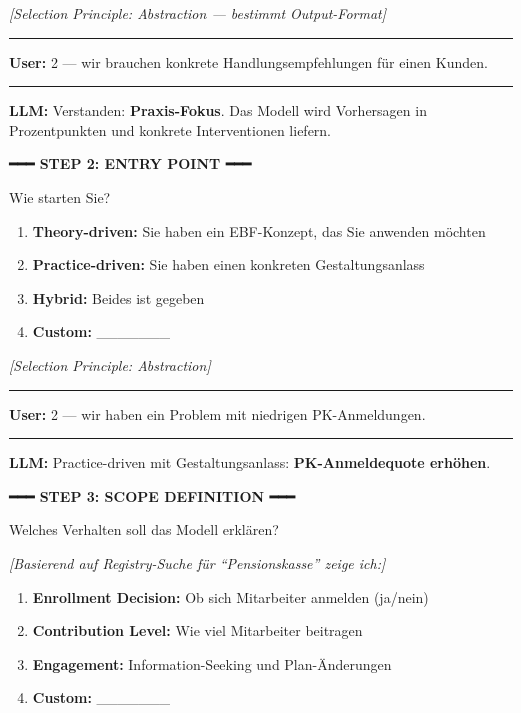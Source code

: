 \begin{tcolorbox}[colback=blue!5!white, colframe=blue!75!black,
    title=Example: GEFÜHRT Model Design (All 10 Steps), breakable]
\textit{[Selection Principle: Abstraction --- bestimmt Output-Format]}

\hrule
\vspace{0.3em}

\textbf{User:} 2 --- wir brauchen konkrete Handlungsempfehlungen für einen Kunden.

\hrule
\vspace{0.3em}

\textbf{LLM:} Verstanden: \textbf{Praxis-Fokus}. Das Modell wird Vorhersagen in
Prozentpunkten und konkrete Interventionen liefern.

\vspace{0.3em}
\textbf{━━━ STEP 2: ENTRY POINT ━━━}
\vspace{0.3em}

Wie starten Sie?
\begin{enumerate}
\item \textbf{Theory-driven:} Sie haben ein EBF-Konzept, das Sie anwenden möchten
\item \textbf{Practice-driven:} Sie haben einen konkreten Gestaltungsanlass
\item \textbf{Hybrid:} Beides ist gegeben
\item \textbf{Custom:} \_\_\_\_\_\_\_
\end{enumerate}

\textit{[Selection Principle: Abstraction]}

\hrule
\vspace{0.3em}

\textbf{User:} 2 --- wir haben ein Problem mit niedrigen PK-Anmeldungen.

\hrule
\vspace{0.3em}

\textbf{LLM:} Practice-driven mit Gestaltungsanlass: \textbf{PK-Anmeldequote erhöhen}.

\vspace{0.3em}
\textbf{━━━ STEP 3: SCOPE DEFINITION ━━━}
\vspace{0.3em}

Welches Verhalten soll das Modell erklären?

\textit{[Basierend auf Registry-Suche für ``Pensionskasse'' zeige ich:]}
\begin{enumerate}
\item \textbf{Enrollment Decision:} Ob sich Mitarbeiter anmelden (ja/nein)
\item \textbf{Contribution Level:} Wie viel Mitarbeiter beitragen
\item \textbf{Engagement:} Information-Seeking und Plan-Änderungen
\item \textbf{Custom:} \_\_\_\_\_\_\_
\end{enumerate}


\end{tcolorbox}
